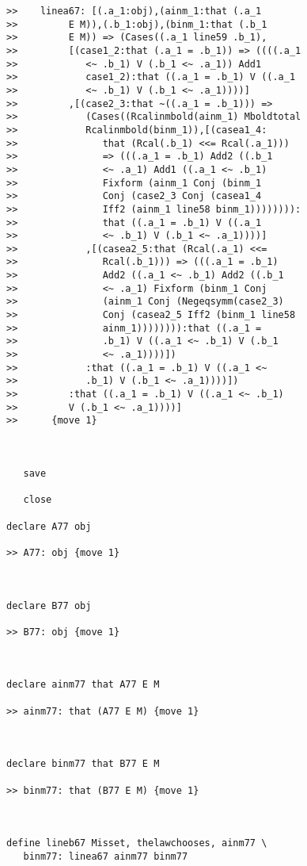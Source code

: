 \documentclass[12pt]{article}
\begin{document}
\begin{verbatim}
>>    linea67: [(.a_1:obj),(ainm_1:that (.a_1
>>         E M)),(.b_1:obj),(binm_1:that (.b_1
>>         E M)) => (Cases((.a_1 line59 .b_1),
>>         [(case1_2:that (.a_1 = .b_1)) => ((((.a_1
>>            <~ .b_1) V (.b_1 <~ .a_1)) Add1
>>            case1_2):that ((.a_1 = .b_1) V ((.a_1
>>            <~ .b_1) V (.b_1 <~ .a_1))))]
>>         ,[(case2_3:that ~((.a_1 = .b_1))) =>
>>            (Cases((Rcalinmbold(ainm_1) Mboldtotal
>>            Rcalinmbold(binm_1)),[(casea1_4:
>>               that (Rcal(.b_1) <<= Rcal(.a_1)))
>>               => (((.a_1 = .b_1) Add2 ((.b_1
>>               <~ .a_1) Add1 ((.a_1 <~ .b_1)
>>               Fixform (ainm_1 Conj (binm_1
>>               Conj (case2_3 Conj (casea1_4
>>               Iff2 (ainm_1 line58 binm_1)))))))):
>>               that ((.a_1 = .b_1) V ((.a_1
>>               <~ .b_1) V (.b_1 <~ .a_1))))]
>>            ,[(casea2_5:that (Rcal(.a_1) <<=
>>               Rcal(.b_1))) => (((.a_1 = .b_1)
>>               Add2 ((.a_1 <~ .b_1) Add2 ((.b_1
>>               <~ .a_1) Fixform (binm_1 Conj
>>               (ainm_1 Conj (Negeqsymm(case2_3)
>>               Conj (casea2_5 Iff2 (binm_1 line58
>>               ainm_1)))))))):that ((.a_1 =
>>               .b_1) V ((.a_1 <~ .b_1) V (.b_1
>>               <~ .a_1))))])
>>            :that ((.a_1 = .b_1) V ((.a_1 <~
>>            .b_1) V (.b_1 <~ .a_1))))])
>>         :that ((.a_1 = .b_1) V ((.a_1 <~ .b_1)
>>         V (.b_1 <~ .a_1))))]
>>      {move 1}



   save

   close

declare A77 obj

>> A77: obj {move 1}



declare B77 obj

>> B77: obj {move 1}



declare ainm77 that A77 E M

>> ainm77: that (A77 E M) {move 1}



declare binm77 that B77 E M

>> binm77: that (B77 E M) {move 1}



define lineb67 Misset, thelawchooses, ainm77 \
   binm77: linea67 ainm77 binm77


\end{verbatim}
\end{document}
